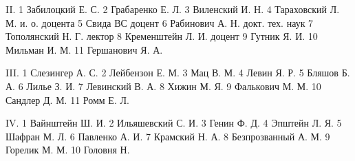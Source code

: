 II. 1 Забилоцкий Е. С.
    2 Грабаренко Е. Л.
    3 Виленский И. Н.
    4 Тараховский Л. М. и. о. доцента
    5 Свида ВС доцент
    6 Рабинович А. Н. докт. тех. наук
    7 Тополянский Н. Г. лектор
    8 Кременштейн Л. И. доцент
    9 Гутник Я. И.
    10 Мильман И. М.
    11 Гершанович Я. А.

III. 1 Слезингер А. С.
     2 Лейбензон Е. М.
     3 Мац В. М.
     4 Левин Я. Р.
     5 Бляшов Б. А.
     6 Лилье З. И.
     7 Левинский В. А.
     8 Хижин М. Я.
     9 Фалькович М. М.
     10 Сандлер Д. М.
     11 Ромм Е. Л.

IV. 1 Вайнштейн Ш. И.
    2 Ильяшевский С. И.
    3 Генин Ф. Д.
    4 Эпштейн Л. Я.
    5 Шафран М. Л.
    6 Павленко А. И.
    7 Крамский Н. А.
    8 Безпрозванный А. М.
    9 Горелик М. М.
    10 Головня Н.

